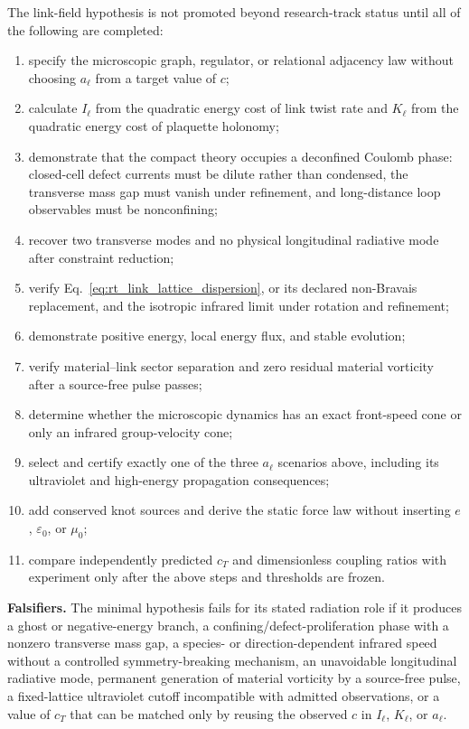 The link-field hypothesis is not promoted beyond research-track status until all
of the following are completed:
\begin{enumerate}
    \item specify the microscopic graph, regulator, or relational adjacency law
    without choosing \(a_\ell\) from a target value of \(c\);
    \item calculate \(I_\ell\) from the quadratic energy cost of link twist rate
    and \(K_\ell\) from the quadratic energy cost of plaquette holonomy;
    \item demonstrate that the compact theory occupies a deconfined Coulomb phase:
    closed-cell defect currents must be dilute rather than condensed, the
    transverse mass gap must vanish under refinement, and long-distance loop
    observables must be nonconfining;
    \item recover two transverse modes and no physical longitudinal radiative
    mode after constraint reduction;
    \item verify Eq.~\eqref{eq:rt_link_lattice_dispersion}, or its declared
    non-Bravais replacement, and the isotropic infrared limit under rotation and
    refinement;
    \item demonstrate positive energy, local energy flux, and stable evolution;
    \item verify material--link sector separation and zero residual material
    vorticity after a source-free pulse passes;
    \item determine whether the microscopic dynamics has an exact front-speed
    cone or only an infrared group-velocity cone;
    \item select and certify exactly one of the three \(a_\ell\) scenarios above,
    including its ultraviolet and high-energy propagation consequences;
    \item add conserved knot sources and derive the static force law without
    inserting \(e\), \(\varepsilon_0\), or \(\mu_0\);
    \item compare independently predicted \(c_T\) and dimensionless coupling
    ratios with experiment only after the above steps and thresholds are frozen.
\end{enumerate}

\textbf{Falsifiers.}
The minimal hypothesis fails for its stated radiation role if it produces a ghost
or negative-energy branch, a confining/defect-proliferation phase with a nonzero
transverse mass gap, a species- or direction-dependent infrared speed without a
controlled symmetry-breaking mechanism, an unavoidable longitudinal radiative
mode, permanent generation of material vorticity by a source-free pulse, a
fixed-lattice ultraviolet cutoff incompatible with admitted observations, or a
value of \(c_T\) that can be matched only by reusing the observed \(c\) in
\(I_\ell\), \(K_\ell\), or \(a_\ell\).


